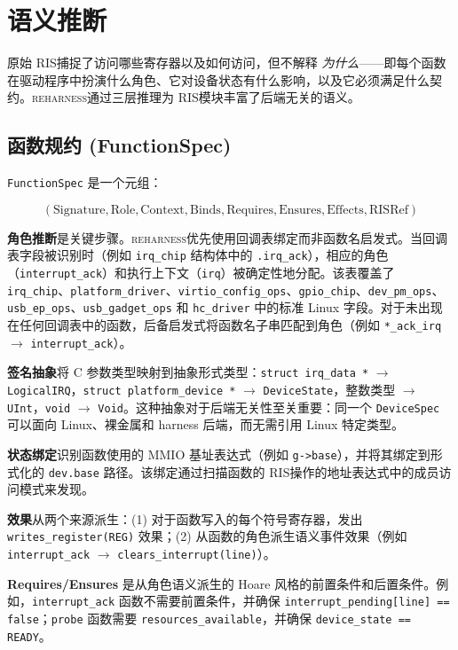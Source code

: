 \documentclass[sigplan, screen, review, anonymous]{acmart}
\newcommand{\reharness}{\textsc{reharness}}
\newcommand{\rislang}{RIS}
\begin{document}
\section{语义推断}

原始 \rislang 捕捉了访问哪些寄存器以及如何访问，但不解释 \emph{为什么}——即每个函数在驱动程序中扮演什么角色、它对设备状态有什么影响，以及它必须满足什么契约。\reharness 通过三层推理为 \rislang 模块丰富了后端无关的语义。

\subsection{函数规约 (FunctionSpec)}

\texttt{FunctionSpec} 是一个元组：

\[
(\text{Signature}, \text{Role}, \text{Context}, \text{Binds}, \text{Requires}, \text{Ensures}, \text{Effects}, \text{RISRef})
\]

\textbf{角色推断}是关键步骤。\reharness 优先使用回调表绑定而非函数名启发式。当回调表字段被识别时（例如 \texttt{irq\_chip} 结构体中的 \texttt{.irq\_ack}），相应的角色（\texttt{interrupt\_ack}）和执行上下文（\texttt{irq}）被确定性地分配。该表覆盖了 \texttt{irq\_chip}、\texttt{platform\_driver}、\texttt{virtio\_config\_ops}、\texttt{gpio\_chip}、\texttt{dev\_pm\_ops}、\texttt{usb\_ep\_ops}、\texttt{usb\_gadget\_ops} 和 \texttt{hc\_driver} 中的标准 Linux 字段。对于未出现在任何回调表中的函数，后备启发式将函数名子串匹配到角色（例如 \texttt{*\_ack\_irq} $\rightarrow$ \texttt{interrupt\_ack}）。

\textbf{签名抽象}将 C 参数类型映射到抽象形式类型：\texttt{struct irq\_data *} $\rightarrow$ \texttt{LogicalIRQ}，\texttt{struct platform\_device *} $\rightarrow$ \texttt{DeviceState}，整数类型 $\rightarrow$ \texttt{UInt}，\texttt{void} $\rightarrow$ \texttt{Void}。这种抽象对于后端无关性至关重要：同一个 \texttt{DeviceSpec} 可以面向 Linux、裸金属和 harness 后端，而无需引用 Linux 特定类型。

\textbf{状态绑定}识别函数使用的 MMIO 基址表达式（例如 \texttt{g->base}），并将其绑定到形式化的 \texttt{dev.base} 路径。该绑定通过扫描函数的 \rislang 操作的地址表达式中的成员访问模式来发现。

\textbf{效果}从两个来源派生：(1) 对于函数写入的每个符号寄存器，发出 \texttt{writes\_register(REG)} 效果；(2) 从函数的角色派生语义事件效果（例如 \texttt{interrupt\_ack} $\rightarrow$ \texttt{clears\_interrupt(line)}）。

\textbf{Requires/Ensures} 是从角色语义派生的 Hoare 风格的前置条件和后置条件。例如，\texttt{interrupt\_ack} 函数不需要前置条件，并确保 \texttt{interrupt\_pending[line] == false}；\texttt{probe} 函数需要 \texttt{resources\_available}，并确保 \texttt{device\_state == READY}。
\end{document}
